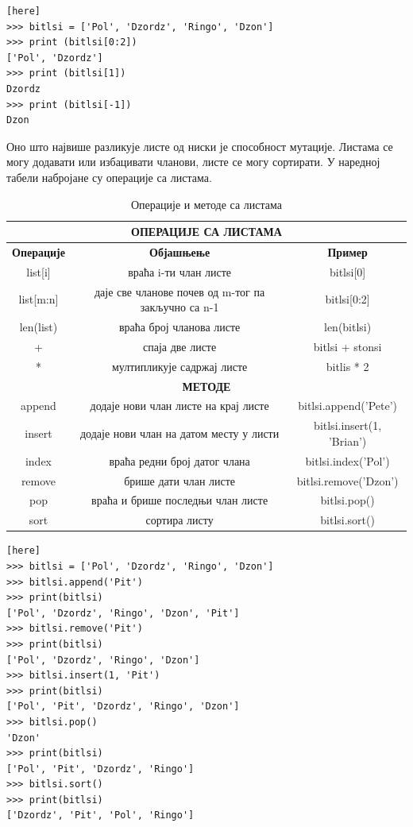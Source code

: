 \documentclass[11pt, serbianc, english, titlepage]{article}
\begin{document}
		 
		 \begin{lstlisting}[caption = Исецање листи, label = list_slice][here]
>>> bitlsi = ['Pol', 'Dzordz', 'Ringo', 'Dzon']
>>> print (bitlsi[0:2])
['Pol', 'Dzordz']
>>> print (bitlsi[1])
Dzordz
>>> print (bitlsi[-1])
Dzon
		\end{lstlisting}
		\medskip\pagebreak
		Оно што највише разликује листе од ниски је способност мутације. Листама се могу додавати или избацивати чланови, листе се могу сортирати. У наредној табели набројане су операције са листама. \\
		\begin{table}[here]
		\centering
		\begin{tabular}{|c|c|c|}\hline
		\multicolumn{3}{|c|}{\textbf{ОПЕРАЦИЈЕ СА ЛИСТАМА}}\\ \hline
		\textbf{Операције} & \textbf{Објашњење} & \textbf{Пример} \\ \hline
		list[i] & враћа i-ти члан листе & bitlsi[0] \\ \hline
		list[m:n] & даје све чланове почев од m-тог па закључно са n-1 & bitlsi[0:2] \\ \hline
		len(list) & враћа број чланова листе & len(bitlsi) \\ \hline
		+ & спаја две листе & bitlsi + stonsi \\ \hline
		* & мултипликује садржај листе & bitlis * 2 \\ \hline
		\multicolumn{3}{|c|}{\textbf{МЕТОДЕ}}\\ \hline
		append & додаје нови члан листе на крај листе & bitlsi.append('Pete')\\ \hline
		insert & додаје нови члан на датом месту у листи & bitlsi.insert(1, 'Brian') \\ \hline
		index & враћа редни број датог члана & bitlsi.index('Pol') \\ \hline
		remove & брише дати члан листе & bitlsi.remove('Dzon') \\ \hline
		pop & враћа и брише последњи члан листе & bitlsi.pop() \\ \hline
		sort & сортира листу & bitlsi.sort() \\ \hline
		\end{tabular}
		\caption{Операције и методе са листама}
		\label{tabela:liste}
		\end{table}
		\begin{lstlisting}[caption= Мењање листе, label = mutacija_list][here]
>>> bitlsi = ['Pol', 'Dzordz', 'Ringo', 'Dzon']
>>> bitlsi.append('Pit')
>>> print(bitlsi)
['Pol', 'Dzordz', 'Ringo', 'Dzon', 'Pit']
>>> bitlsi.remove('Pit')
>>> print(bitlsi)
['Pol', 'Dzordz', 'Ringo', 'Dzon']
>>> bitlsi.insert(1, 'Pit')
>>> print(bitlsi)
['Pol', 'Pit', 'Dzordz', 'Ringo', 'Dzon']
>>> bitlsi.pop()
'Dzon'
>>> print(bitlsi)
['Pol', 'Pit', 'Dzordz', 'Ringo']
>>> bitlsi.sort()
>>> print(bitlsi)
['Dzordz', 'Pit', 'Pol', 'Ringo']
		\end{lstlisting}
		
\end{document}
